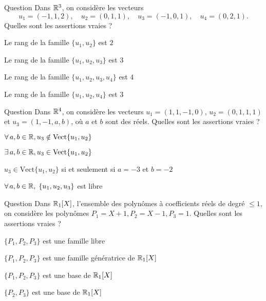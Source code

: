 \begin{multi}[multiple,feedback=
{Le rang d'une famille de vecteurs est la dimension du sous-espace vectoriel
engendré par ces vecteurs. Autrement dit, c'est le nombre maximum de vecteurs de cette famille qui sont linéairement indépendants. On vérifie que \(u_1=u_2+u_3 \) et que \(\{u_1,u_2,u_4\}\) est libre.
}]{Question}
Dans \(\mathbb{R}^3\), on considère les vecteurs
\[u_1=(-1,1,2),\quad u_2=(0,1,1),\quad  u_3=(-1,0,1),\quad u_4=(0,2,1).\]
Quelles sont les assertions vraies ?

    \item* Le rang de la famille \(\{u_1,u_2\}\) est \(2\)
    \item Le rang de la famille \(\{u_1,u_2,u_3\}\) est \(3\)
    \item Le rang de la famille \(\{u_1,u_2,u_3,u_4\}\) est \(4\)
    \item* Le rang de la famille \(\{u_1,u_2,u_4\}\) est \(3\)
\end{multi}


\begin{multi}[multiple,feedback=
{\(u_3 \in {\mbox{Vect}} \{u_1,u_2\}\) si, et seulement si, il existe \(\alpha, \beta \in \Rr\) tels que 
\(u_3=\alpha u_1+ \beta u_2\). En résolvant ce système, on obtient \(b=-2\) et \(a=-3\). Pour \(a=-3\) et \(b=-2\), la famille \(\{u_1,u_2,u_3\}\) n'est pas libre.
}]{Question}
Dans \(\mathbb{R}^4\), on considère les vecteurs \(u_1=(1,1,-1,0)\), \(u_2=(0,1,1,1)\) et \(u_3=(1,-1,a,b)\), où \(a\) et \(b\) sont des réels. Quelles sont les assertions vraies ?

    \item \(\forall \, a,b \in \mathbb{R}, u_3 \notin \mbox{Vect}\{u_1,u_2\}\)
    \item* \(\exists \,  a,b \in \mathbb{R}, u_3 \in {\mbox{Vect}} \{u_1,u_2\}\)
    \item* \(u_3\in \mbox{Vect}\{u_1,u_2\}\) si et seulement si \(a=-3\) et \(b=-2\)
    \item \(\forall \, a,b \in \mathbb{R}, \; \{u_1,u_2,u_3\}\) est libre
\end{multi}


\begin{multi}[multiple,feedback=
{On a : \(P_1-P_2-2P_3=0\), donc \(\{P_1,P_2,P_3 \}\) n'est pas libre. Par contre, \(\{P_1,P_2,P_3 \}\) est une famille génératrice de \(\Rr_1[X]\) puisqu'elle contient \(2\) polynômes non colinéaires. Toute famille extraite de \(\{P_1,P_2,P_3 \}\), contenant \(2\) vecteurs, est une base de \(\Rr_1[X]\).
}]{Question}
Dans \(\Rr_1[X]\), l'ensemble des polynômes à coefficients réels de degré \(\le 1\), on considère les polynômes \(P_1= X+1, P_2= X-1, P_3 = 1\). Quelles sont les assertions vraies ?

    \item \(\{P_1,P_2,P_3\}\) est une famille libre
    \item* \(\{P_1,P_2,P_3\}\) est une famille génératrice de \(\Rr_1[X]\)
    \item \(\{P_1,P_2,P_3\}\) est une base de \(\Rr_1[X]\)
    \item* \(\{P_2,P_3\}\) est une base de \(\Rr_1[X]\)
\end{multi}


